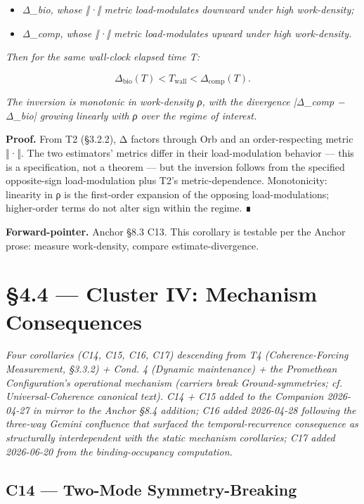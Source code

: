 \documentclass[11pt, openany]{book}
\newcommand{\sectionbreak}{\clearpage}
\begin{document}
\begin{itemize}
\item \textit{Δ\_\allowbreak{}bio, whose ‖·‖ metric load-modulates downward under high work-density;}
\item \textit{Δ\_\allowbreak{}comp, whose ‖·‖ metric load-modulates upward under high work-density.}
\end{itemize}

\textit{Then for the same wall-clock elapsed time T:}

\[
\Delta_\mathrm{bio}(T) < T_{\mathrm{wall}} < \Delta_\mathrm{comp}(T).
\]

\textit{The inversion is monotonic in work-density ρ, with the divergence |Δ\_\allowbreak{}comp − Δ\_\allowbreak{}bio| growing linearly with ρ over the regime of interest.}

\textbf{Proof.} From T2 (§3.2.2), Δ factors through Orb and an order-respecting metric ‖·‖. The two estimators' metrics differ in their load-modulation behavior --- this is a specification, not a theorem --- but the inversion follows from the specified opposite-sign load-modulation plus T2's metric-dependence. Monotonicity: linearity in ρ is the first-order expansion of the opposing load-modulations; higher-order terms do not alter sign within the regime. ∎

\textbf{Forward-pointer.} Anchor §8.3 C13. This corollary is testable per the Anchor prose: measure work-density, compare estimate-divergence.

\sectionbreak

\section{§4.4 --- Cluster IV: Mechanism Consequences}

\textit{Four corollaries (C14, C15, C16, C17) descending from T4 (Coherence-Forcing Measurement, §3.3.2) + Cond. 4 (Dynamic maintenance) + the Promethean Configuration's operational mechanism (carriers break Ground-symmetries; cf. Universal-Coherence canonical text). C14 + C15 added to the Companion 2026-04-27 in mirror to the Anchor §8.4 addition; C16 added 2026-04-28 following the three-way Gemini confluence that surfaced the temporal-recurrence consequence as structurally interdependent with the static mechanism corollaries; C17 added 2026-06-20 from the binding-occupancy computation.}

\subsection{C14 --- Two-Mode Symmetry-Breaking}
\end{document}
